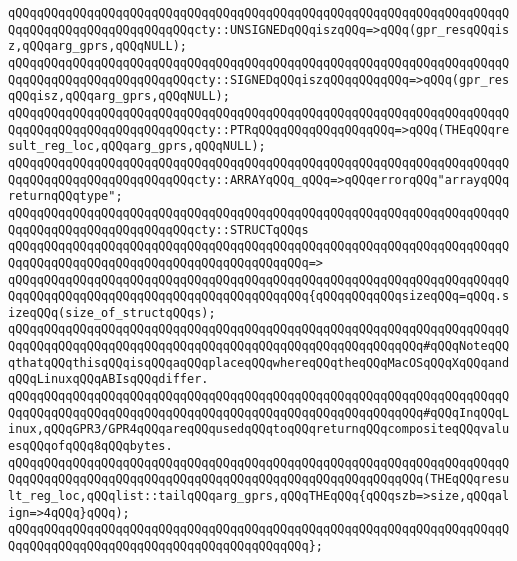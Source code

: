\verb|qQQqqQQqqQQqqQQqqQQqqQQqqQQqqQQqqQQqqQQqqQQqqQQqqQQqqQQqqQQqqQQqqQQqqQQqqQQqqQQqqQQqqQQqqQQqqQQqcty::UNSIGNEDqQQqiszqQQq=>qQQq(gpr_resqQQqisz,qQQqarg_gprs,qQQqNULL);|\newline
\verb|qQQqqQQqqQQqqQQqqQQqqQQqqQQqqQQqqQQqqQQqqQQqqQQqqQQqqQQqqQQqqQQqqQQqqQQqqQQqqQQqqQQqqQQqqQQqqQQqcty::SIGNEDqQQqiszqQQqqQQqqQQq=>qQQq(gpr_resqQQqisz,qQQqarg_gprs,qQQqNULL);|\newline
\newline
\verb|qQQqqQQqqQQqqQQqqQQqqQQqqQQqqQQqqQQqqQQqqQQqqQQqqQQqqQQqqQQqqQQqqQQqqQQqqQQqqQQqqQQqqQQqqQQqqQQqcty::PTRqQQqqQQqqQQqqQQqqQQq=>qQQq(THEqQQqresult_reg_loc,qQQqarg_gprs,qQQqNULL);|\newline
\verb|qQQqqQQqqQQqqQQqqQQqqQQqqQQqqQQqqQQqqQQqqQQqqQQqqQQqqQQqqQQqqQQqqQQqqQQqqQQqqQQqqQQqqQQqqQQqqQQqcty::ARRAYqQQq_qQQq=>qQQqerrorqQQq"arrayqQQqreturnqQQqtype";|\newline
\newline
\verb|qQQqqQQqqQQqqQQqqQQqqQQqqQQqqQQqqQQqqQQqqQQqqQQqqQQqqQQqqQQqqQQqqQQqqQQqqQQqqQQqqQQqqQQqqQQqqQQqcty::STRUCTqQQqs|\newline
\verb|qQQqqQQqqQQqqQQqqQQqqQQqqQQqqQQqqQQqqQQqqQQqqQQqqQQqqQQqqQQqqQQqqQQqqQQqqQQqqQQqqQQqqQQqqQQqqQQqqQQqqQQqqQQqqQQq=>|\newline
\verb|qQQqqQQqqQQqqQQqqQQqqQQqqQQqqQQqqQQqqQQqqQQqqQQqqQQqqQQqqQQqqQQqqQQqqQQqqQQqqQQqqQQqqQQqqQQqqQQqqQQqqQQqqQQqqQQq{qQQqqQQqqQQqsizeqQQq=qQQq.sizeqQQq(size_of_structqQQqs);|\newline
\newline
\verb|qQQqqQQqqQQqqQQqqQQqqQQqqQQqqQQqqQQqqQQqqQQqqQQqqQQqqQQqqQQqqQQqqQQqqQQqqQQqqQQqqQQqqQQqqQQqqQQqqQQqqQQqqQQqqQQqqQQqqQQqqQQqqQQq#qQQqNoteqQQqthatqQQqthisqQQqisqQQqaqQQqplaceqQQqwhereqQQqtheqQQqMacOSqQQqXqQQqandqQQqLinuxqQQqABIsqQQqdiffer.|\newline
\verb|qQQqqQQqqQQqqQQqqQQqqQQqqQQqqQQqqQQqqQQqqQQqqQQqqQQqqQQqqQQqqQQqqQQqqQQqqQQqqQQqqQQqqQQqqQQqqQQqqQQqqQQqqQQqqQQqqQQqqQQqqQQqqQQq#qQQqInqQQqLinux,qQQqGPR3/GPR4qQQqareqQQqusedqQQqtoqQQqreturnqQQqcompositeqQQqvaluesqQQqofqQQq8qQQqbytes.|\newline
\newline
\verb|qQQqqQQqqQQqqQQqqQQqqQQqqQQqqQQqqQQqqQQqqQQqqQQqqQQqqQQqqQQqqQQqqQQqqQQqqQQqqQQqqQQqqQQqqQQqqQQqqQQqqQQqqQQqqQQqqQQqqQQqqQQqqQQq(THEqQQqresult_reg_loc,qQQqlist::tailqQQqarg_gprs,qQQqTHEqQQq{qQQqszb=>size,qQQqalign=>4qQQq}qQQq);|\newline
\verb|qQQqqQQqqQQqqQQqqQQqqQQqqQQqqQQqqQQqqQQqqQQqqQQqqQQqqQQqqQQqqQQqqQQqqQQqqQQqqQQqqQQqqQQqqQQqqQQqqQQqqQQqqQQqqQQq};|\newline
